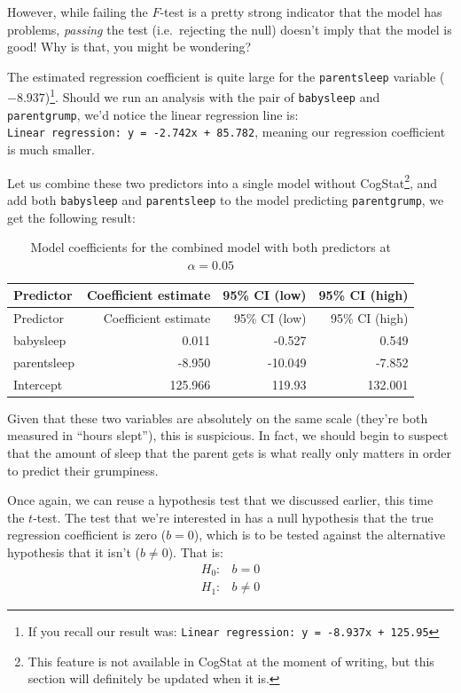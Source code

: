 \documentclass[
  11pt,
  a4paper,
  twoside,symmetric,openright]{book}
\theoremstyle{break}
\theoremstyle{break}
\begin{document}
However, while failing the \(F\)-test is a pretty strong indicator that the model has problems, \emph{passing} the test (i.e.~rejecting the null) doesn't imply that the model is good! Why is that, you might be wondering?

The estimated regression coefficient is quite large for the \texttt{parentsleep} variable (\(-8.937\))\footnote{If you recall our result was: \texttt{Linear\ regression:\ y\ =\ -8.937x\ +\ 125.95}}. Should we run an analysis with the pair of \texttt{babysleep} and \texttt{parentgrump}, we'd notice the linear regression line is: \texttt{Linear\ regression:\ y\ =\ -2.742x\ +\ 85.782}, meaning our regression coefficient is much smaller.

Let us combine these two predictors into a single model without CogStat\footnote{This feature is not available in CogStat at the moment of writing, but this section will definitely be updated when it is.}, and add both \texttt{babysleep} and \texttt{parentsleep} to the model predicting \texttt{parentgrump}, we get the following result:

\begin{longtable}[]{@{}lrrr@{}}
\caption{\label{tab:unnamed-chunk-109}Model coefficients for the combined model with both predictors at \(\alpha = 0.05\)}\tabularnewline
\toprule\noalign{}
Predictor & Coefficient estimate & 95\% CI (low) & 95\% CI (high) \\
\midrule\noalign{}
\endfirsthead
\toprule\noalign{}
Predictor & Coefficient estimate & 95\% CI (low) & 95\% CI (high) \\
\midrule\noalign{}
\endhead
\bottomrule\noalign{}
\endlastfoot
babysleep & 0.011 & -0.527 & 0.549 \\
parentsleep & -8.950 & -10.049 & -7.852 \\
Intercept & 125.966 & 119.93 & 132.001 \\
\end{longtable}

Given that these two variables are absolutely on the same scale (they're both measured in ``hours slept''), this is suspicious. In fact, we should begin to suspect that the amount of sleep that the parent gets is what really only matters in order to predict their grumpiness.

Once again, we can reuse a hypothesis test that we discussed earlier, this time the \(t\)-test. The test that we're interested in has a null hypothesis that the true regression coefficient is zero (\(b = 0\)), which is to be tested against the alternative hypothesis that it isn't (\(b \neq 0\)). That is:
\[
\begin{array}{rl}
H_0: & b = 0 \\
H_1: & b \neq 0 
\end{array}
\]
\end{document}
